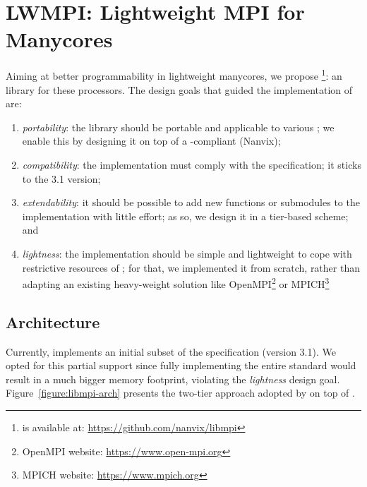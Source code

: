 \section{LWMPI: Lightweight MPI for Manycores}
\label{sec:proposal}

	Aiming at better programmability in lightweight manycores,
	we propose \lwmpi\footnote{\lwmpi is available at:
	\url{https://github.com/nanvix/libmpi}}: an \mpi library for these
	processors.
	The design goals that guided the implementation of \lwmpi are:
	\begin{enumerate}[label=(\roman*)]
		\item \textit{portability}: the library should be portable and
			applicable to various \lws; we enable this by designing it
			on top of a \posix-compliant \os (Nanvix);

		\item \textit{compatibility}: the implementation
			must comply with the \mpi specification; it sticks to the
			3.1 version;

		\item \textit{extendability}: it should be possible to add new
			functions or submodules to the implementation with little
			effort; as so, we design it in a tier-based scheme; and

		\item \textit{lightness}: the implementation should be simple and
			lightweight to cope with restrictive resources of \lws; for that,
			we implemented it from scratch, rather than adapting an existing
			heavy-weight solution like
			OpenMPI\footnote{OpenMPI website: \url{https://www.open-mpi.org}} or
			MPICH\footnote{MPICH website: \url{https://www.mpich.org}}
	\end{enumerate}


\subsection{\lwmpi Architecture}
\label{sec:libmpi-impl}

	Currently, \lwmpi implements an initial subset of the \mpi
	specification (version 3.1). We opted for this partial support since
	fully implementing the entire standard would result in a much bigger
	memory footprint, violating the \textit{lightness} design goal.
	Figure~\ref{figure:libmpi-arch} presents the two-tier approach
	adopted by \lwmpi on top of \nanvix.

